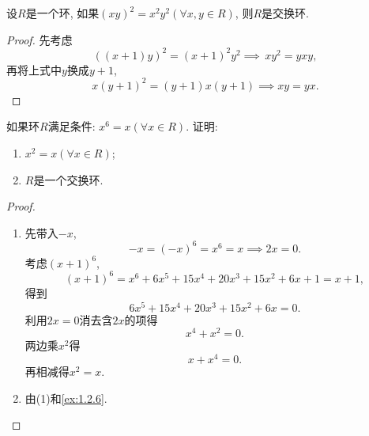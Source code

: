 \begin{problem}
    设$R$是一个环, 如果$(xy)^2 = x^2y^2 (\forall x, y \in R)$, 则$R$是交换环.
\end{problem}

\begin{proof}
    先考虑
    \[
        ((x + 1)y)^2 = (x + 1)^2y^2 \implies\, xy^2 = yxy,
    \]
    再将上式中$y$换成$y + 1$,
    \[
        x(y + 1)^2 = (y + 1)x(y + 1) \implies xy = yx.
    \]
\end{proof}

\begin{problem}
    如果环$R$满足条件: $x^6 = x (\forall x \in R)$. 证明:
    \begin{enumerate}[(1)]
        \item $x^2 = x (\forall x \in R)$;
        \item $R$是一个交换环.
    \end{enumerate}
\end{problem}

\begin{proof}
    \begin{enumerate}[(1)]
        \item 先带入$-x$,
        \[
            -x = (-x)^6 = x^6 = x \implies 2x = 0.
        \]
        考虑$(x + 1)^6$,
        \[
            (x + 1)^6 = x^6 + 6x^5 + 15x^4 + 20x^3 + 15x^2 + 6x + 1 = x + 1,
        \]
        得到
        \[
            6x^5 + 15x^4 + 20x^3 + 15x^2 + 6x = 0.
        \]
        利用$2x = 0$消去含$2x$的项得
        \[
            x^4 + x^2 = 0.
        \]
        两边乘$x^2$得
        \[
            x + x^4 = 0.
        \]
        再相减得$x^2 = x$.
        \item 由(1)和\ref{ex:1.2.6}.
    \end{enumerate}
\end{proof}